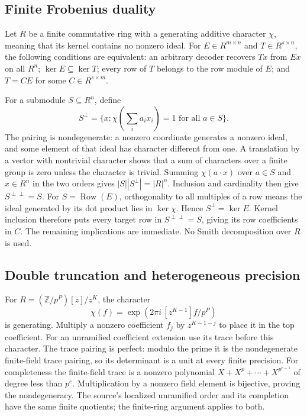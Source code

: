 \documentclass[11pt,a4paper]{article}
\begin{document}
\subsection{Finite Frobenius duality}\label{v8-finite-frobenius-duality}

Let \(R\) be a finite commutative ring with a generating additive
character \(\chi\), meaning that its kernel contains no nonzero ideal.
For \(E\in R^{m\times n}\) and \(T\in R^{s\times n}\), the following
conditions are equivalent: an arbitrary decoder recovers \(Tx\) from
\(Ex\) on all \(R^n\); \(\ker E\subseteq\ker T\); every row of \(T\)
belongs to the row module of \(E\); and \(T=CE\) for some
\(C\in R^{s\times m}\).

For a submodule \(S\subseteq R^n\), define \[
 S^\perp=\{x:\chi(\sum_i a_i x_i)=1\text{ for all }a\in S\}.
\] The pairing is nondegenerate: a nonzero coordinate generates a
nonzero ideal, and some element of that ideal has character different
from one. A translation by a vector with nontrivial character shows that
a sum of characters over a finite group is zero unless the character is
trivial. Summing \(\chi(a\cdot x)\) over \(a\in S\) and \(x\in R^n\) in
the two orders gives \(|S||S^\perp|=|R|^n\). Inclusion and cardinality
then give \(S^{\perp\perp}=S\). For \(S=\operatorname{Row}(E)\),
orthogonality to all multiples of a row means the ideal generated by its
dot product lies in \(\ker\chi\). Hence \(S^\perp=\ker E\). Kernel
inclusion therefore puts every target row in \(S^{\perp\perp}=S\),
giving its row coefficients in \(C\). The remaining implications are
immediate. No Smith decomposition over \(R\) is used.

\subsection{Double truncation and heterogeneous
precision}\label{v8-double-truncation-and-heterogeneous-precision}

For \(R=(\mathbb Z/p^P)[z]/z^K\), the character \[
 \chi(f)=\exp\left(2\pi i\,[z^{K-1}]f/p^P\right)
\] is generating. Multiply a nonzero coefficient \(f_j\) by
\(z^{K-1-j}\) to place it in the top coefficient. For an unramified
coefficient extension use its trace before this character. The trace
pairing is perfect: modulo the prime it is the nondegenerate
finite-field trace pairing, so its determinant is a unit at every finite
precision. For completeness the finite-field trace is a nonzero
polynomial \(X+X^p+\cdots+X^{p^{e-1}}\) of degree less than \(p^e\).
Multiplication by a nonzero field element is bijective, proving the
nondegeneracy. The source's localized unramified order and its
completion have the same finite quotients; the finite-ring argument
applies to both.
\end{document}
